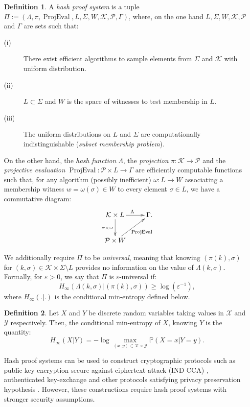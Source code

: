 \documentclass[a4paper,10pt,notitlepage]{report}
\theoremstyle{definition}
\newtheorem{Definition}{Definition}[chapter]
\theoremstyle{plain}
\theoremstyle{definition}
\newcommand{\m}[1]{\mathcal{#1}}
\renewcommand{\(}{\left(}
\renewcommand{\)}{\right)}
\renewcommand{\P}{\mathbb{P}}
\DeclareMathOperator{\ProjEval}{ProjEval}
\begin{document}
\begin{Definition}
A \emph{hash proof system} is a tuple $\Pi:=(\Lambda,\pi,\ProjEval,L,\Sigma,W,\m{K},\m{P},\Gamma)$, where, on the one hand $L,\Sigma,W,\m{K},\m{P}$ and $\Gamma$ are sets such that:
\begin{description}
\item[(i)] There exist efficient algorithms to sample elements from $\Sigma$ and $\m{K}$ with uniform distribution.
\item[(ii)] $L\subset \Sigma$ and $W$ is the space of witnesses to test membership in $L$.
\item[(iii)]  The uniform distributions on $L$ and $\Sigma$ are computationally indistinguishable (\emph{subset membership problem}).
\end{description}

On the other hand, the \emph{hash function} $\Lambda$, the  \emph{projection} $\pi: \m{K}\longrightarrow \m{P}$ and the \emph{projective evaluation}  $\ProjEval:  \m{P}\times L\longrightarrow \Gamma$ are efficiently computable functions such that, for any algorithm (possibly inefficient) $\omega : L\longrightarrow W$ associating a membership witness $w=\omega(\sigma)\in W$ to every element $\sigma\in L$, we have a commutative diagram:
\[
\xymatrix{
\m{K}\times L  \ar[r]^{\Lambda} \ar[d]_{\pi\times\omega} & \Gamma.\\
\m{P}\times W \ar[ru]_{\ProjEval} &
}
\]

We additionally require $\Pi$ to be \emph{universal}, meaning that knowing $(\pi(k),\sigma)$ for $(k,\sigma)\in \m{K}\times \Sigma\setminus L$ provides no information on the value of $\Lambda(k,\sigma)$. Formally, for $\varepsilon>0$, we say that $\Pi$ is $\varepsilon$-universal if:
\[H_\infty(\Lambda(k,\sigma)|(\pi(k),\sigma))\geq\log(\varepsilon^{-1}),\]
where $H_\infty(.|.)$ is the conditional min-entropy defined below.
\end{Definition}

\begin{Definition}
Let $X$ and $Y$ be discrete random variables taking values in $\m{X}$ and $\m{Y}$ respectively. Then, the conditional min-entropy of $X$, knowing $Y$ is the quantity:
\[H_\infty(X|Y)=-\log\max_{(x,y)\in\m{X}\times\m{Y}}\P(X=x|Y=y).\]
\end{Definition}

Hash proof systems can be used to construct cryptographic protocols such as public key encryption secure against ciphertext attack (IND-CCA) \cite{Cramer_Shoup}, authenticated key-exchange \cite{GL_AKE} and other protocols satisfying privacy preservation hypothesis \cite{BPV_privacy}. However, these constructions require hash proof systems with stronger security assumptions.
\end{document}
